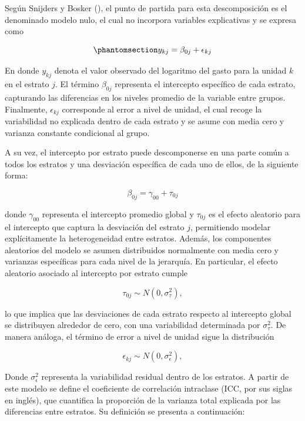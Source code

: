 \documentclass[
  spanish,
  11pt,
  letterpaper,
  oneside,
  open=any]{scrbook}
\begin{document}
Según Snijders y Bosker (), el punto de
partida para esta descomposición es el denominado modelo nulo, el cual
no incorpora variables explicativas y se expresa como

\begin{equation}\protect\phantomsection\label{eq-modelo-multinivel-nulo}{
y_{kj} = \beta_{0j} + \epsilon_{kj}
}\end{equation}

En donde \(y_{kj}\) denota el valor observado del logaritmo del gasto
para la unidad \(k\) en el estrato \(j\). El término \(\beta_{0j}\)
representa el intercepto específico de cada estrato, capturando las
diferencias en los niveles promedio de la variable entre grupos.
Finalmente, \(\epsilon_{kj}\) corresponde al error a nivel de unidad, el
cual recoge la variabilidad no explicada dentro de cada estrato y se
asume con media cero y varianza constante condicional al grupo.

A su vez, el intercepto por estrato puede descomponerse en una parte
común a todos los estratos y una desviación específica de cada uno de
ellos, de la siguiente forma:

\[
\beta_{0j} = \gamma_{00} + \tau_{0j}
\]

donde \(\gamma_{00}\) representa el intercepto promedio global y
\(\tau_{0j}\) es el efecto aleatorio para el intercepto que captura la
desviación del estrato \(j\), permitiendo modelar explícitamente la
heterogeneidad entre estratos. Además, los componentes aleatorios del
modelo se asumen distribuidos normalmente con media cero y varianzas
específicas para cada nivel de la jerarquía. En particular, el efecto
aleatorio asociado al intercepto por estrato cumple

\[
\tau_{0j} \sim N\left(0, \sigma_{\tau}^{2}\right),
\]

lo que implica que las desviaciones de cada estrato respecto al
intercepto global se distribuyen alrededor de cero, con una variabilidad
determinada por \(\sigma_{\tau}^{2}\). De manera análoga, el término de
error a nivel de unidad sigue la distribución

\[
\epsilon_{kj} \sim N\left(0, \sigma_{\epsilon}^{2}\right),
\]

Donde \(\sigma_{\epsilon}^{2}\) representa la variabilidad residual
dentro de los estratos. A partir de este modelo se define el coeficiente
de correlación intraclase (ICC, por sus siglas en inglés), que
cuantifica la proporción de la varianza total explicada por las
diferencias entre estratos. Su definición se presenta a continuación:
\end{document}
